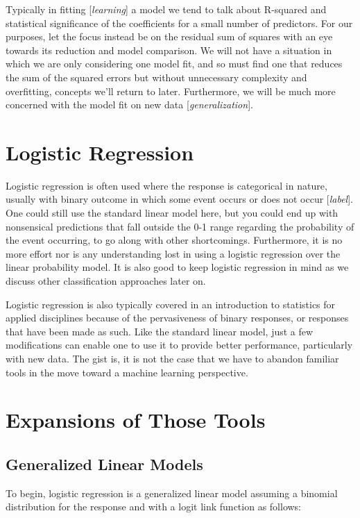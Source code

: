 \documentclass[english,nohyper,titlepage]{tufte-handout}\usepackage{knitr}
\begin{document}
Typically in fitting [\emph{learning}] a model we tend to talk about R-squared and statistical significance of the coefficients for a small number of predictors.  For our purposes, let the focus instead be on the residual sum of squares with an eye towards its reduction and model comparison. We will not have a situation in which we are only considering one model fit, and so must find one that reduces the sum of the squared errors but without unnecessary complexity and overfitting, concepts we'll return to later.  Furthermore, we will be much more concerned with the model fit on new data [\emph{generalization}].

\section{Logistic Regression}
Logistic regression is often used where the response is categorical in nature, usually with binary outcome in which some event occurs or does not occur [\emph{label}].  One could still use the standard linear model here, but you could end up with nonsensical predictions that fall outside the 0-1 range regarding the probability of the event occurring, to go along with other shortcomings.  Furthermore, it is no more effort nor is any understanding lost in using a logistic regression over the linear probability model.  It is also good to keep logistic regression in mind as we discuss other classification approaches later on.

Logistic regression is also typically covered in an introduction to statistics for applied disciplines because of the pervasiveness of binary responses, or responses that have been made as such.  Like the standard linear model, just a few modifications can enable one to use it to provide better performance, particularly with new data.  The gist is, it is not the case that we have to abandon familiar tools in the move toward a machine learning perspective.


\section{Expansions of Those Tools}

\subsection{Generalized Linear Models}
To begin, logistic regression is a generalized linear model assuming a binomial distribution for the response and with a logit link function as follows:
\end{document}
